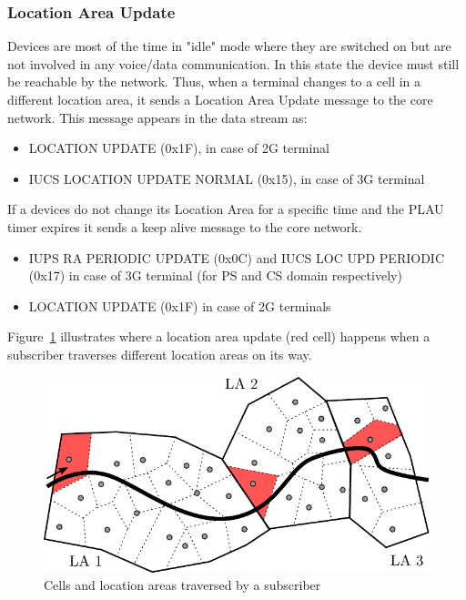 \documentclass[master,english]{hgbthesis}
\begin{document}
\subsubsection{Location Area Update}
Devices are most of the time in "idle" mode where they are switched on but are not involved in any voice/data communication. In this state the device must still be reachable by the network. Thus, when a terminal changes to a cell in a different location area, it sends a Location Area Update message to the core network.
This message appears in the data stream as:
\begin{itemize}
	\item LOCATION UPDATE (0x1F), in case of 2G terminal
	\item IUCS LOCATION UPDATE NORMAL (0x15), in case of 3G terminal
\end{itemize}
If a devices do not change its Location Area for a specific time and the PLAU timer expires it sends a keep alive message to the core network.
\begin{itemize}
	\item IUPS RA PERIODIC UPDATE (0x0C) and IUCS LOC UPD PERIODIC
	      (0x17) in case of 3G terminal (for PS and CS domain respectively)
	\item LOCATION UPDATE (0x1F) in case of 2G terminals
\end{itemize}
Figure~\ref{fig:latraversed} illustrates where a location area update (red cell) happens when a subscriber traverses different location areas on its way.
%
\begin{figure}
	\centering
	\includegraphics[width=\linewidth]{./images/laupdate.pdf}
	\caption{Cells and location areas traversed by a subscriber}
	\label{fig:latraversed}
\end{figure}
\end{document}
